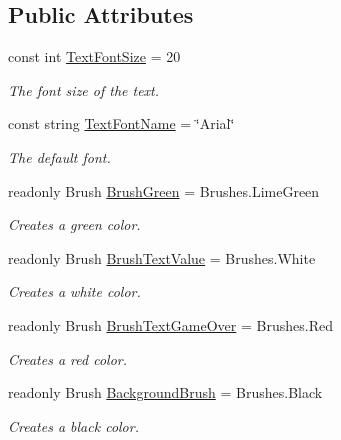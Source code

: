 \subsection*{Public Attributes}
\begin{DoxyCompactItemize}
\item 
const int \mbox{\hyperlink{class_o_e_invaders_1_1_library_1_1_text_storage_ae0cc6c26bd7d1dde5a4c2a333e59cdb7}{Text\+Font\+Size}} = 20
\begin{DoxyCompactList}\small\item\em The font size of the text. \end{DoxyCompactList}\item 
const string \mbox{\hyperlink{class_o_e_invaders_1_1_library_1_1_text_storage_a931da2e630199a60018d85f1fb54ca92}{Text\+Font\+Name}} = \char`\"{}Arial\char`\"{}
\begin{DoxyCompactList}\small\item\em The default font. \end{DoxyCompactList}\item 
readonly Brush \mbox{\hyperlink{class_o_e_invaders_1_1_library_1_1_text_storage_a5929faccfe96e84af13dd56e9c1e320a}{Brush\+Green}} = Brushes.\+Lime\+Green
\begin{DoxyCompactList}\small\item\em Creates a green color. \end{DoxyCompactList}\item 
readonly Brush \mbox{\hyperlink{class_o_e_invaders_1_1_library_1_1_text_storage_aa59683e4a6cc3b16f8fb278ffa58b1d2}{Brush\+Text\+Value}} = Brushes.\+White
\begin{DoxyCompactList}\small\item\em Creates a white color. \end{DoxyCompactList}\item 
readonly Brush \mbox{\hyperlink{class_o_e_invaders_1_1_library_1_1_text_storage_a842fb28b109ba71543c592e92a2967d4}{Brush\+Text\+Game\+Over}} = Brushes.\+Red
\begin{DoxyCompactList}\small\item\em Creates a red color. \end{DoxyCompactList}\item 
readonly Brush \mbox{\hyperlink{class_o_e_invaders_1_1_library_1_1_text_storage_a597e73ba713d67d0b0c0d1b20f0040e3}{Background\+Brush}} = Brushes.\+Black
\begin{DoxyCompactList}\small\item\em Creates a black color. \end{DoxyCompactList}\item 

\end{DoxyCompactItemize}
